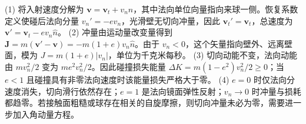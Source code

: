 (1) 将入射速度分解为 \(\mathbf v=\mathbf v_t+v_n\hat n\)，其中法向单位向量指向来球一侧。恢复系数定义使碰后法向分量 \(v_n'=-ev_n\)，光滑壁无切向冲量，因此 \(\mathbf v_t'=\mathbf v_t\)，总速度为 \(\mathbf v'=\mathbf v_t-ev_n\hat n\)。
(2) 冲量由运动量改变量得到 \(\mathbf J=m(\mathbf v'-\mathbf v)=-m(1+e)v_n\hat n\)。由于 \(v_n<0\)，这个矢量指向壁外、远离壁面，模为 \(J=m(1+e)|v_n|\)，单位为千克米每秒。
(3) 切向动能不变，法向动能由 \(mv_n^2/2\) 变为 \(me^2v_n^2/2\)。因此碰撞损失能量 \(\Delta K=m(1-e^2)v_n^2/2\ge0\)；当 \(e<1\) 且碰撞具有非零法向速度时该能量损失严格大于零。
(4) \(e=0\) 时仅法向分速度消失，切向滑行依然存在；\(e=1\) 是法向镜面弹性反射；\(v_n\to0\) 时冲量与损耗都趋零。若接触面粗糙或球存在相关的自旋摩擦，则切向冲量未必为零，需要进一步加入角动量方程。
